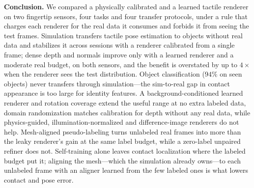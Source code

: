 \noindent\textbf{Conclusion.}
We compared a physically calibrated and a learned tactile renderer on two fingertip sensors, four tasks and four transfer protocols, under a rule that charges each renderer for the real data it consumes and forbids it from seeing the test frames. Simulation transfers tactile pose estimation to objects without real data and stabilizes it across sessions with a renderer calibrated from a single frame; dense depth and normals improve only with a learned renderer and a moderate real budget, on both sensors, and the benefit is overstated by up to $4\times$ when the renderer sees the test distribution. Object classification ($94\%$ on seen objects) never transfers through simulation---the sim-to-real gap in contact appearance is too large for identity features. A background-conditioned learned renderer and rotation coverage extend the useful range at no extra labeled data, domain randomization matches calibration for depth without any real data, while physics-guided, illumination-normalized and difference-image renderers do not help. Mesh-aligned pseudo-labeling turns unlabeled real frames into more than the leaky renderer's gain at the same label budget, while a zero-label unpaired refiner does not. Self-training alone leaves contact localization where the labeled budget put it; aligning the mesh---which the simulation already owns---to each unlabeled frame with an aligner learned from the few labeled ones is what lowers contact and pose error.

